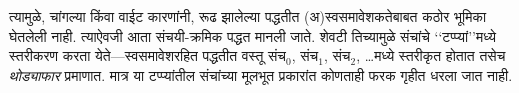 \documentclass[../../../include/open-logic-section]{subfiles}
\begin{document}
त्यामुळे,
चांगल्या किंवा
वाईट कारणांनी,
रूढ झालेल्या
पद्धतीत
(अ)स्वसमावेशकतेबाबत
कठोर भूमिका
घेतलेली नाही.
त्याऐवजी
आता संचयी-क्रमिक
पद्धत मानली
जाते. शेवटी
तिच्यामुळे
संचांचे
‘‘टप्प्यां’’मध्ये
स्तरीकरण करता
येते---स्वसमावेशरहित
पद्धतीत वस्तू
संच$_0$,
संच$_1$,
संच$_2$,
\ldots मध्ये
स्तरीकृत
होतात तसेच
\emph{थोड्याफार}
प्रमाणात.
मात्र या
टप्प्यांतील
संचांच्या
मूलभूत प्रकारांत
कोणताही
फरक गृहीत
धरला जात
नाही.
\end{document}
